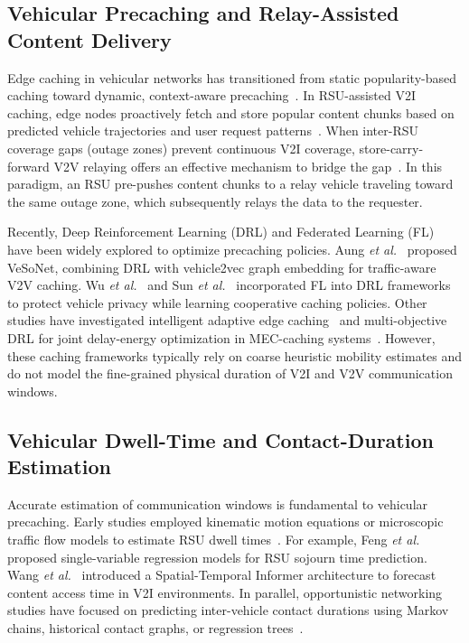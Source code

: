 \documentclass[journal]{IEEEtran}
\begin{document}
\subsection{Vehicular Precaching and Relay-Assisted Content Delivery}
Edge caching in vehicular networks has transitioned from static popularity-based caching toward dynamic, context-aware precaching~\cite{Bouk2015,Su2017,Wang2019,Zhang2019,Nam2025,Wu2020,Gupta2023,Liang2025,Tan2018,Zhang2018}. In RSU-assisted V2I caching, edge nodes proactively fetch and store popular content chunks based on predicted vehicle trajectories and user request patterns~\cite{Kim2017,Yuan2018,Zeng2023}. When inter-RSU coverage gaps (outage zones) prevent continuous V2I coverage, store-carry-forward V2V relaying offers an effective mechanism to bridge the gap~\cite{Wu2013,Wang2017,Ahmed2018,Nam2023}. In this paradigm, an RSU pre-pushes content chunks to a relay vehicle traveling toward the same outage zone, which subsequently relays the data to the requester.

Recently, Deep Reinforcement Learning (DRL) and Federated Learning (FL) have been widely explored to optimize precaching policies. Aung \textit{et al.}~\cite{Aung2023} proposed VeSoNet, combining DRL with vehicle2vec graph embedding for traffic-aware V2V caching. Wu \textit{et al.}~\cite{QWu2023} and Sun \textit{et al.}~\cite{Sun2023} incorporated FL into DRL frameworks to protect vehicle privacy while learning cooperative caching policies. Other studies have investigated intelligent adaptive edge caching~\cite{TWang2024} and multi-objective DRL for joint delay-energy optimization in MEC-caching systems~\cite{ZLi2024}. However, these caching frameworks typically rely on coarse heuristic mobility estimates and do not model the fine-grained physical duration of V2I and V2V communication windows.

\subsection{Vehicular Dwell-Time and Contact-Duration Estimation}
Accurate estimation of communication windows is fundamental to vehicular precaching. Early studies employed kinematic motion equations or microscopic traffic flow models to estimate RSU dwell times~\cite{Feng2023}. For example, Feng \textit{et al.}~\cite{Feng2023} proposed single-variable regression models for RSU sojourn time prediction. Wang \textit{et al.}~\cite{Wang2025} introduced a Spatial-Temporal Informer architecture to forecast content access time in V2I environments. In parallel, opportunistic networking studies have focused on predicting inter-vehicle contact durations using Markov chains, historical contact graphs, or regression trees~\cite{Wu2013,Ahmed2018}.
\end{document}
